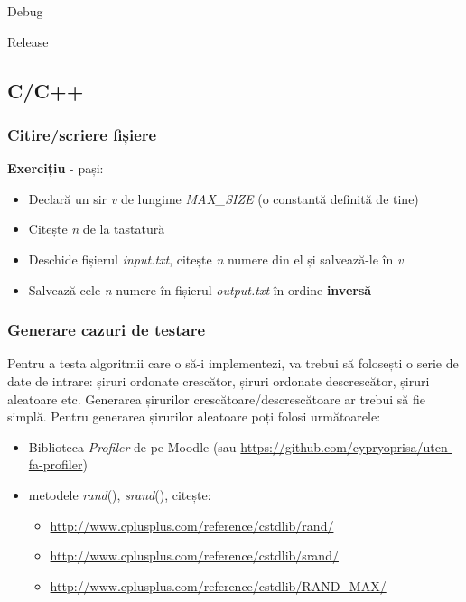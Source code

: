 \documentclass[../ro-fa-lab.tex]{subfiles}
\begin{document}
Debug

Release

\subsection{C/C++}\label{cc}

\subsubsection{Citire/scriere fișiere}\label{citirescriere-fiux219iere}

\textbf{Exercițiu} - pași:

\begin{itemize}
\item
  Declară un sir \emph{v} de lungime \emph{MAX\_SIZE} (o constantă
  definită de tine)
\item
  Citește \emph{n} de la tastatură
\item
  Deschide fișierul \emph{input.txt}, citește \emph{n} numere din el și
  salvează-le în \emph{v}
\item
  Salvează cele \emph{n} numere în fișierul \emph{output.txt} în ordine
  \textbf{inversă}
\end{itemize}

\subsubsection{Generare cazuri de
testare}\label{generare-cazuri-de-testare}

Pentru a testa algoritmii care o să-i implementezi, va trebui să
folosești o serie de date de intrare: șiruri ordonate crescător, șiruri
ordonate descrescător, șiruri aleatoare etc. Generarea șirurilor
crescătoare/descrescătoare ar trebui să fie simplă. Pentru generarea
șirurilor aleatoare poți folosi următoarele:

\begin{itemize}
\item
  Biblioteca \emph{Profiler} de pe Moodle (sau
  \url{https://github.com/cypryoprisa/utcn-fa-profiler})
\end{itemize}

\begin{itemize}
\item
  metodele \emph{rand}(), \emph{srand}(), citește:

  \begin{itemize}
  \item
    \url{http://www.cplusplus.com/reference/cstdlib/rand/}
  \item
    \url{http://www.cplusplus.com/reference/cstdlib/srand/}
  \item
    \url{http://www.cplusplus.com/reference/cstdlib/RAND_MAX/}
  \end{itemize}
\end{itemize}
\end{document}
